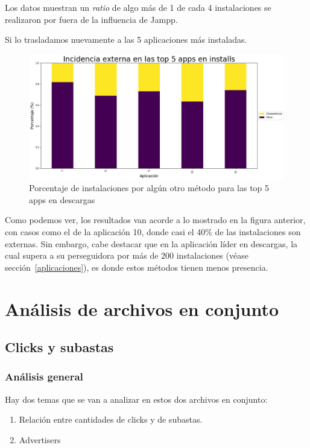 \documentclass[a4paper, 12pt]{article}
\begin{document}
		Los datos muestran un \textit{ratio} de algo más de 1 de cada 4 instalaciones se realizaron por fuera de la influencia de Jampp.

		Si lo trasladamos nuevamente a las 5 aplicaciones más instaladas.

		\FloatBarrier
		\begin{figure}[h]
			\centering
			\includegraphics[width=\textwidth]{images/installs/incidenciacomp.png}
			\caption{Porcentaje de instalaciones por algún otro método para las top 5 apps en descargas}
		\end{figure}
		\FloatBarrier

		Como podemos ver, los resultados van acorde a lo mostrado en la figura anterior, con casos como el de la aplicación 10, donde casi el 40\% de las instalaciones son externas. Sin embargo, cabe destacar que en la aplicación líder en descargas, la cual supera a su perseguidora por más de 200 instalaciones (véase sección~\ref{aplicaciones}), es donde estos métodos tienen menos presencia.

\clearpage
\section{Análisis de archivos en conjunto}
\subsection{Clicks y subastas}
	\subsubsection{Análisis general}
	 Hay dos temas que se van a analizar en estos dos archivos en conjunto:
	\begin{enumerate}
		\item Relación entre cantidades de clicks y de subastas.
		\item Advertisers
	\end{enumerate}
\end{document}
